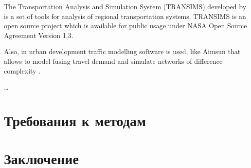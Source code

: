 The Transportation Analysis and Simulation System (TRANSIMS) developed by \cite{transims} is a set of 
tools for analysis of regional transportation systems. TRANSIMS is an open source project which is 
available for public usage under NASA Open Source Agreement Version 1.3.
 
Also, in urban development traffic modelling software is used, like Aimsun that allows to model fusing 
travel demand and simulate networks of difference complexity \cite{aimsun}.

\ldots

\section{Требования к методам}
\section{Заключение}